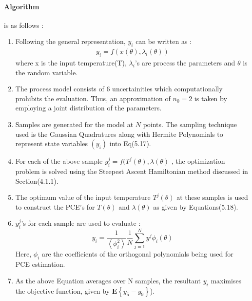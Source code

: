 \paragraph{Algorithm} is as follows : 
\begin{enumerate}
\item Following the general representation, $y_{i}$ can be written as :
\begin{align*}
y_{i} = f(x(\theta),\lambda_{i}(\theta))
\end{align*}
where x is the input temperature(T), $\lambda_{i}$'s are process the parameters and $\theta$ is the random variable.
\item The process model consists of 6 uncertainities which computationally prohibits the evaluation. Thus, an approximation of $n_{0} = 2$ is taken by employing a joint distribution of the parameters.
\item Samples are generated for the model at $N$ points. The sampling technique used is the Gaussian Quadratures along with Hermite Polynomials to represent state variables $(y_{i})$ into Eq(5.17).

\item For each of the above sample $y^{j}_{i} = f(T^{j}(\theta),\lambda(\theta) $ ,  the optimization problem is solved using the Steepest Ascent Hamiltonian method discussed in Section(4.1.1).

\item The optimum value of the input temperature $T^{j}(\theta)$ at these samples is used to construct the PCE's for $T(\theta)$ and $\lambda(\theta)$ as given by Equations(5.18).

\item $y^{j}_{i}$'s for each sample are used to evaluate :
\begin{equation}
y_{i} = \frac{1}{\left\langle \phi^{2}_{i}\right\rangle }\frac{1}{N} \sum_{j=1}^{N} y^{j}\phi_{i}(\theta)
\end{equation}
Here, $\phi_{i}$ are the coefficients of the orthogonal polynomials being used for PCE estimation.  

\item As the above Equation averages over N samples, the resultant $y_{i}$ maximises the objective function, given by $ \mathbf{E} \left\lbrace  y_{5}-y_{9} \right\rbrace $). 

\end{enumerate} 

